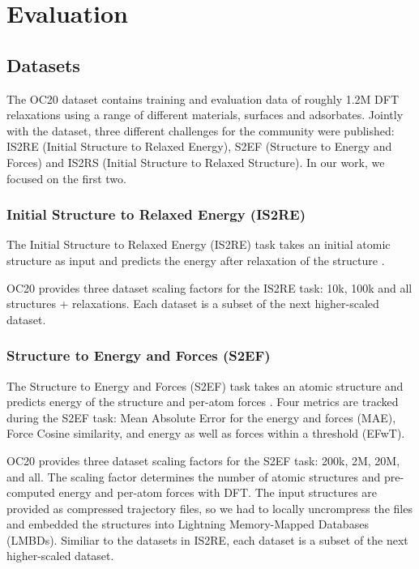 \section{Evaluation}
\label{section:evaluation}

\subsection{Datasets}

The OC20 dataset \cite{Chanussot_2021} contains training and evaluation data of roughly 
1.2M DFT relaxations using a range of different materials, surfaces and adsorbates. 
Jointly with the dataset, three different challenges for the community were published:
IS2RE (Initial Structure to Relaxed Energy), S2EF (Structure to Energy and Forces) and
IS2RS (Initial Structure to Relaxed Structure). In our work, we focused on the first two.

\subsubsection{Initial Structure to Relaxed Energy (IS2RE)}

The Initial Structure to Relaxed Energy (IS2RE) task takes an initial atomic 
structure as input and predicts the energy after relaxation of the structure 
\cite*{Chanussot_2021, https://doi.org/10.48550/arxiv.2206.08917}. 


OC20 provides three dataset scaling factors for the IS2RE task: 10k, 100k and 
all structures + relaxations. Each dataset is a subset of the next higher-scaled 
dataset.

\subsubsection{Structure to Energy and Forces (S2EF)}

The Structure to Energy and Forces (S2EF) task takes an atomic structure and 
predicts energy of the structure and per-atom forces 
\cite*{Chanussot_2021, https://doi.org/10.48550/arxiv.2206.08917}. Four metrics 
are tracked during the S2EF task: Mean Absolute Error for the energy and forces 
(MAE), Force Cosine similarity, and energy as well as forces within a threshold 
(EFwT). 

OC20 provides three dataset scaling factors for the S2EF task: 200k, 2M, 20M,  
and all. The scaling factor determines the number of atomic structures and 
pre-computed energy and per-atom forces with DFT. The input structures are 
provided as compressed trajectory files, so we had to locally uncrompress the 
files and embedded the structures into Lightning Memory-Mapped Databases (LMBDs). 
Similiar to the datasets in IS2RE, each dataset is a subset of the next 
higher-scaled dataset. 